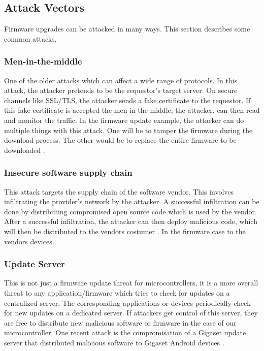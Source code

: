 \subsection{Attack Vectors}\label{subsec:attack-vectors}
Firmware upgrades can be attacked in many ways. This section describes some common attacks.

\subsubsection{Men-in-the-middle}\label{subsubsec:mitm}
One of the older attacks which can affect a wide range of protocols. In this attack, the attacker pretends to be the requestor's target server. On secure channels like SSL/TLS, the attacker sends a fake certificate to the requestor. If this fake certificate is accepted the men in the middle, the attacker, can then read and monitor the traffic. In the firmware update example, the attacker can do multiple things with this attack. One will be to tamper the firmware during the download process. The other would be to replace the entire firmware to be downloaded \cite{Desmedt2011} \cite{6769681}.

\subsubsection{Insecure software supply chain}
This attack targets the supply chain of the software vendor. This involves infiltrating the provider's network by the attacker. A successful infiltration can be done by distributing compromised open source code which is used by the vendor. After a successful infiltration, the attacker can then deploy malicious code, which will then be distributed to the vendors costumer \cite{CybersecurityandInfrastructureSecurityAgency2021}. In the firmware case to the vendors devices. 

\subsubsection{Update Server}\label{subsubsec:update-server}
This is not just a firmware update threat for microcontrollers, it is a more overall threat to any application/firmware which tries to check for updates on a centralized server. The corresponding applications or devices periodically check for new updates on a dedicated server. If attackers get control of this server, they are free to distribute new malicious software or firmware in the case of our microcontroller. One recent attack is the compromisation of a Gigaset update server that distributed malicious software to Gigaset Android devices \cite{Born2021}. 

